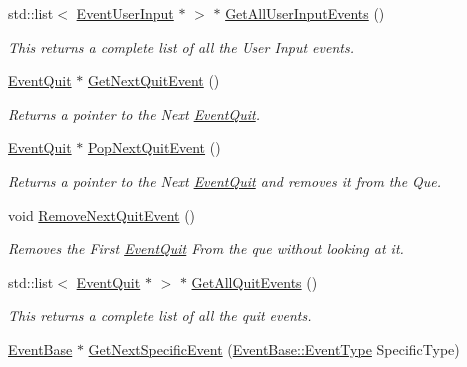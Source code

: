 \begin{DoxyCompactItemize}
std::list$<$ \hyperlink{classphys_1_1EventUserInput}{EventUserInput} $\ast$ $>$ $\ast$ \hyperlink{classphys_1_1EventManager_aef240dacae9479c4385d540e4feab867}{GetAllUserInputEvents} ()
\begin{DoxyCompactList}\small\item\em This returns a complete list of all the User Input events. \item\end{DoxyCompactList}\item 
\hyperlink{classphys_1_1EventQuit}{EventQuit} $\ast$ \hyperlink{classphys_1_1EventManager_ad7da09e5422b1db79ac4187ee9198d0c}{GetNextQuitEvent} ()
\begin{DoxyCompactList}\small\item\em Returns a pointer to the Next \hyperlink{classphys_1_1EventQuit}{EventQuit}. \item\end{DoxyCompactList}\item 
\hyperlink{classphys_1_1EventQuit}{EventQuit} $\ast$ \hyperlink{classphys_1_1EventManager_a9b0d8e4d76fef35423bb862d7127b747}{PopNextQuitEvent} ()
\begin{DoxyCompactList}\small\item\em Returns a pointer to the Next \hyperlink{classphys_1_1EventQuit}{EventQuit} and removes it from the Que. \item\end{DoxyCompactList}\item 
void \hyperlink{classphys_1_1EventManager_a5031871aa6e044764ec2963228f735dd}{RemoveNextQuitEvent} ()
\begin{DoxyCompactList}\small\item\em Removes the First \hyperlink{classphys_1_1EventQuit}{EventQuit} From the que without looking at it. \item\end{DoxyCompactList}\item 
std::list$<$ \hyperlink{classphys_1_1EventQuit}{EventQuit} $\ast$ $>$ $\ast$ \hyperlink{classphys_1_1EventManager_afefd52a9693bc5541592997abbf3c53f}{GetAllQuitEvents} ()
\begin{DoxyCompactList}\small\item\em This returns a complete list of all the quit events. \item\end{DoxyCompactList}\item 
\hyperlink{classphys_1_1EventBase}{EventBase} $\ast$ \hyperlink{classphys_1_1EventManager_a7340cfab326856cf4ebc653b11101016}{GetNextSpecificEvent} (\hyperlink{classphys_1_1EventBase_a5e6a8564e127f654123f0bf6a2751923}{EventBase::EventType} SpecificType)

\end{DoxyCompactItemize}

